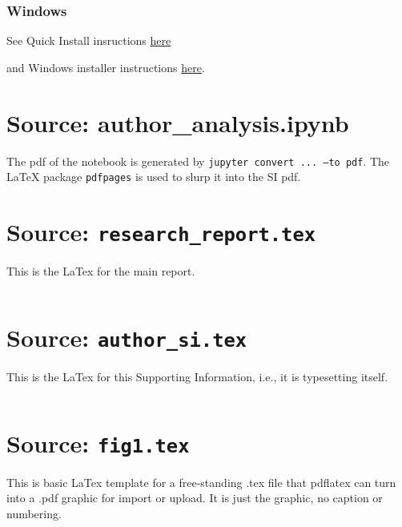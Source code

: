 \documentclass[letter,doc,natbib,11pt]{apa7}  %
\begin{document}
\subsubsection{Windows}


See Quick Install insructions 
\href{https://www.tug.org/texlive/quickinstall.html}{here}

and Windows installer instructions
\href{https://www.tug.org/texlive/acquire-netinstall.html}{here}.



\newpage
\normalsize
\section{Source: author\_analysis.ipynb}

The pdf of the notebook is generated by {\tt jupyter convert ... --to pdf}. The
LaTeX{} package {\tt pdfpages} is used to slurp it into the SI pdf.




\newpage
\section{Source: {\tt research\_report.tex}}
This is the LaTex{} for the main report. 

\inputminted{latex}{author_ms.tex}


\newpage
\section{Source: {\tt author\_si.tex}}

This is the LaTex{} for this Supporting Information, i.e., it is 
typesetting itself. 

\inputminted{latex}{author_si.tex}


\newpage
\section{Source: {\tt fig1.tex}}
This is basic LaTex{} template for a free-standing .tex file that pdflatex can turn
into a .pdf graphic for import or upload. It is just the graphic, no caption or numbering.
\end{document}
